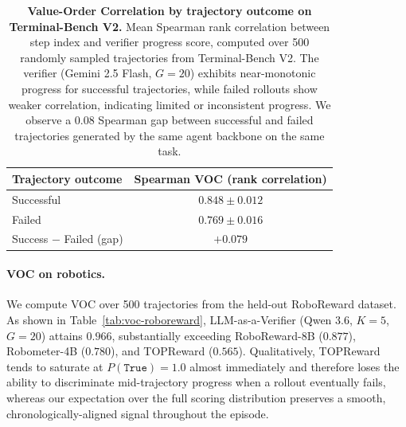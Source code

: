 \begin{table}[h]
    \centering
    \begin{tabular}{lc}
        \toprule
        \textbf{Trajectory outcome} & \textbf{Spearman VOC (rank correlation)} \\
        \midrule
        Successful                                & $0.848 \pm 0.012$ \\
        Failed                                    & $0.769 \pm 0.016$ \\
        \midrule
        Success $-$ Failed (gap)                  & $+0.079$          \\
        \bottomrule
    \end{tabular}
\caption{\textbf{Value-Order Correlation by trajectory outcome on Terminal-Bench V2.}
Mean Spearman rank correlation between step index and verifier progress score, computed over 500 randomly sampled trajectories from Terminal-Bench V2. The verifier (Gemini 2.5 Flash, $G{=}20$) exhibits near-monotonic progress for successful trajectories, while failed rollouts show weaker correlation, indicating limited or inconsistent progress. We observe a $0.08$ Spearman gap between successful and failed trajectories generated by the same agent backbone on the same task.}
    \label{tab:voc-terminal-by-outcome}
\end{table}

\paragraph{VOC on robotics.} We compute VOC over 500 trajectories from the held-out RoboReward dataset. As shown in Table~\ref{tab:voc-roboreward}, LLM-as-a-Verifier (Qwen 3.6, $K{=}5$, $G{=}20$) attains $\mathbf{0.966}$, substantially exceeding RoboReward-8B ($0.877$), Robometer-4B ($0.780$), and TOPReward ($0.565$). Qualitatively, TOPReward tends to saturate at $P(\texttt{True}){=}1.0$ almost immediately and therefore loses the ability to discriminate mid-trajectory progress when a rollout eventually fails, whereas our expectation over the full scoring distribution preserves a smooth, chronologically-aligned signal throughout the episode.

